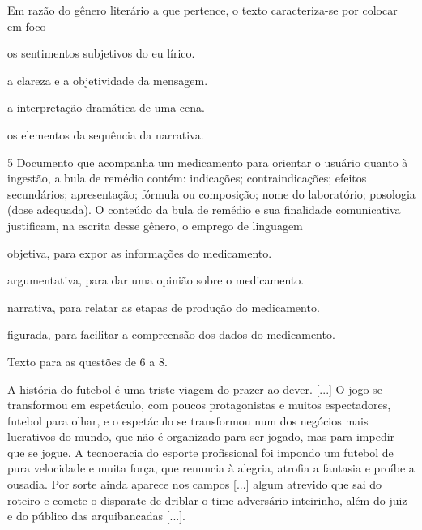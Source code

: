 \pagebreak
Em razão do gênero literário a que pertence, o texto caracteriza-se por
colocar em foco

\begin{escolha}
\item os sentimentos subjetivos do eu lírico.

\item a clareza e a objetividade da mensagem.

\item a interpretação dramática de uma cena.

\item os elementos da sequência da narrativa.
\end{escolha}

\num{5} Documento que acompanha um medicamento para orientar o
usuário quanto à ingestão, a bula de remédio contém: indicações;
contraindicações; efeitos secundários; apresentação; fórmula ou composição;
nome do laboratório; posologia (dose adequada). O conteúdo 
da bula de remédio e sua finalidade comunicativa justificam,
na escrita desse gênero, o emprego de linguagem

\begin{escolha}
\item objetiva, para expor as informações do medicamento.

\item argumentativa, para dar uma opinião sobre o medicamento.

\item narrativa, para relatar as etapas de produção do medicamento.

\item figurada, para facilitar a compreensão dos dados do medicamento.
\end{escolha}


Texto para as questões de 6 a 8.

\begin{myquote}
A história do futebol é uma triste viagem do prazer ao dever. {[}...{]}
O jogo se transformou em espetáculo, com poucos protagonistas e muitos
espectadores, futebol para olhar, e o espetáculo se transformou num dos
negócios mais lucrativos do mundo, que não é organizado para ser jogado,
mas para impedir que se jogue. A tecnocracia do esporte profissional foi
impondo um futebol de pura velocidade e muita força, que renuncia à
alegria, atrofia a fantasia e proíbe a ousadia. Por sorte ainda aparece
nos campos {[}...{]} algum atrevido que sai do roteiro e comete o
disparate de driblar o time adversário inteirinho, além do juiz e do
público das arquibancadas {[}...{]}.

\end{myquote}

